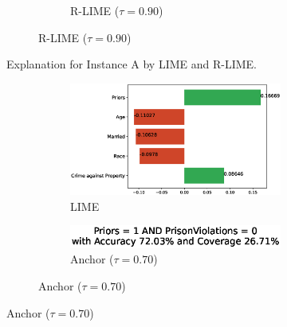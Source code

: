 \documentclass[runningheads]{llncs}
\begin{document}
{\begin{figure}[t]
\begin{subfigure}[t]{0.45\textwidth}
\begin{subfigure}[t]{\textwidth}
          \caption{R-LIME ($\tau=0.90$)}
        \end{subfigure}
      \end{subfigure}
      \caption[Explanation for Instance A by LIME and R-LIME]{%
        Explanation for Instance A by LIME and R-LIME\@.
      }\label{fig:A}
    \end{figure}
    \begin{figure}[t]
      \begin{subfigure}[t]{0.45\textwidth}
        \begin{subfigure}[t]{\textwidth}
          \hspace{-26.5pt}
          \includegraphics[scale=\scale]{src/experiments/exp1/lime-0011}
          \caption{LIME}\label{fig:lime-1}
          \vspace{1.0em}
        \end{subfigure}

        \vspace{10pt}
        \begin{subfigure}[t]{\textwidth}
          \centering
          \includegraphics[scale=0.33]{src/experiments/exp1/anchor-0011-70}  %
          \caption{Anchor ($\tau=0.70$)}
          \vspace{1.0em}
        \end{subfigure}


\end{subfigure}
\end{figure}}
\end{document}
